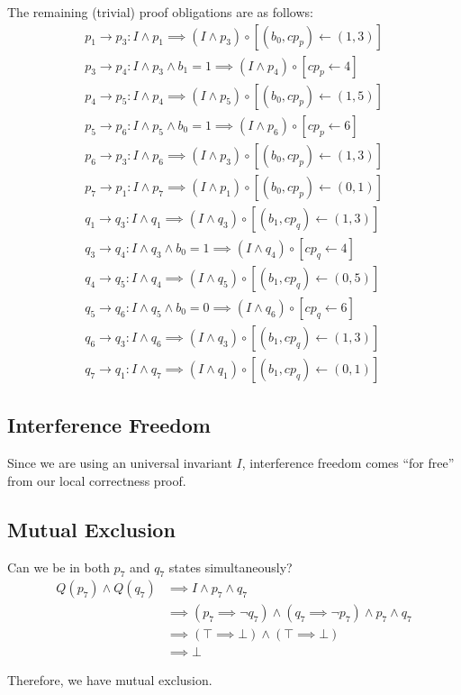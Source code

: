 \documentclass[a4paper]{scrartcl}
\newcommand{\true}{\top}
\newcommand{\false}{\bot}
\newcommand{\comp}{\circ}
\begin{document}
The remaining (trivial) proof obligations are as follows:
\begin{align*}
    p_1 \to p_3: I \land p_1 \implies (I \land p_3) \comp [(b_0, cp_p) \leftarrow (1, 3)] \\
    p_3 \to p_4: I \land p_3 \land b_1 = 1 \implies (I \land p_4) \comp [cp_p \leftarrow 4] \\
    p_4 \to p_5: I \land p_4 \implies (I \land p_5) \comp [(b_0, cp_p) \leftarrow (1, 5)] \\
    p_5 \to p_6: I \land p_5 \land b_0 = 1 \implies (I \land p_6) \comp [cp_p \leftarrow 6] \\
    p_6 \to p_3: I \land p_6 \implies (I \land p_3) \comp [(b_0, cp_p) \leftarrow (1, 3)] \\
    p_7 \to p_1: I \land p_7 \implies (I \land p_1) \comp [(b_0, cp_p) \leftarrow (0, 1)] \\
    q_1 \to q_3: I \land q_1 \implies (I \land q_3) \comp [(b_1, cp_q) \leftarrow (1, 3)] \\
    q_3 \to q_4: I \land q_3 \land b_0 = 1 \implies (I \land q_4) \comp [cp_q \leftarrow 4] \\
    q_4 \to q_5: I \land q_4 \implies (I \land q_5) \comp [(b_1, cp_q) \leftarrow (0, 5)] \\
    q_5 \to q_6: I \land q_5 \land b_0 = 0 \implies (I \land q_6) \comp [cp_q \leftarrow 6] \\
    q_6 \to q_3: I \land q_6 \implies (I \land q_3) \comp [(b_1, cp_q) \leftarrow (1, 3)] \\
    q_7 \to q_1: I \land q_7 \implies (I \land q_1) \comp [(b_1, cp_q) \leftarrow (0, 1)]
\end{align*}

\subsection{Interference Freedom}
Since we are using an universal invariant \(I\), interference freedom comes ``for free'' from our local correctness proof.

\subsection{Mutual Exclusion}
Can we be in both \(p_7\) and \(q_7\) states simultaneously?
\begin{align*}
    Q(p_7) \land Q(q_7) &\implies I \land p_7 \land q_7 \\
    &\implies (p_7 \implies \lnot q_7) \land (q_7 \implies \lnot p_7) \land p_7 \land q_7 \\
    &\implies (\true \implies \false) \land (\true \implies \false) \\
    &\implies \false
\end{align*}

Therefore, we have mutual exclusion.
\end{document}
